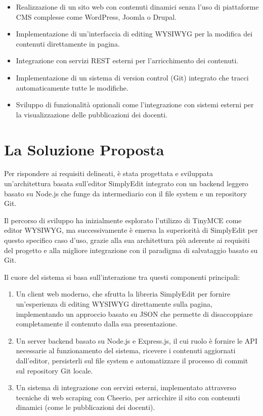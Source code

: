 \begin{itemize}
    \item Realizzazione di un sito web con contenuti dinamici senza l'uso di piattaforme CMS complesse come WordPress, Joomla o Drupal.
    \item Implementazione di un'interfaccia di editing WYSIWYG per la modifica dei contenuti direttamente in pagina.
    \item Integrazione con servizi REST esterni per l'arricchimento dei contenuti.
    \item Implementazione di un sistema di version control (Git) integrato che tracci automaticamente tutte le modifiche.
    \item Sviluppo di funzionalità opzionali come l'integrazione con sistemi esterni per la visualizzazione delle pubblicazioni dei docenti.
\end{itemize}

\section{La Soluzione Proposta}
Per rispondere ai requisiti delineati, è stata progettata e sviluppata un'architettura basata sull'editor SimplyEdit integrato con un backend leggero basato su Node.js che funge da intermediario con il file system e un repository Git.

Il percorso di sviluppo ha inizialmente esplorato l'utilizzo di TinyMCE come editor WYSIWYG, ma successivamente è emersa la superiorità di SimplyEdit per questo specifico caso d'uso, grazie alla sua architettura più aderente ai requisiti del progetto e alla migliore integrazione con il paradigma di salvataggio basato su Git.

Il cuore del sistema si basa sull'interazione tra questi componenti principali:
\begin{enumerate}
    \item Un client web moderno, che sfrutta la libreria SimplyEdit per fornire un'esperienza di editing WYSIWYG direttamente sulla pagina, implementando un approccio basato su JSON che permette di disaccoppiare completamente il contenuto dalla sua presentazione.
    \item Un server backend basato su Node.js e Express.js, il cui ruolo è fornire le API necessarie al funzionamento del sistema, ricevere i contenuti aggiornati dall'editor, persisterli sul file system e automatizzare il processo di commit sul repository Git locale.
    \item Un sistema di integrazione con servizi esterni, implementato attraverso tecniche di web scraping con Cheerio, per arricchire il sito con contenuti dinamici (come le pubblicazioni dei docenti).
\end{enumerate}

